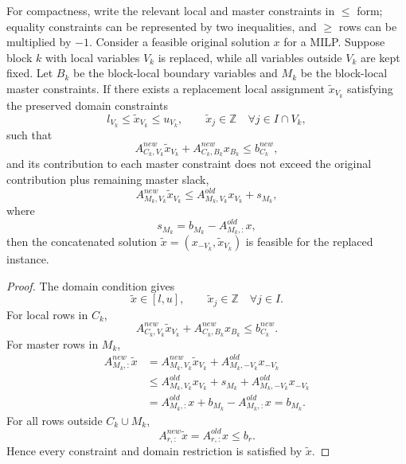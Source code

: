 \documentclass[letterpaper]{article}
\begin{document}
For compactness, write the relevant local and master constraints in
$\le$ form; equality constraints can be represented by two inequalities,
and $\ge$ rows can be multiplied by $-1$. Consider a feasible original
solution $x$ for a MILP. Suppose block $k$ with local variables $V_k$ is
replaced, while all variables outside $V_k$ are kept fixed. Let $B_k$ be
the block-local boundary variables and $M_k$ be the block-local master
constraints. If there exists a replacement local assignment
$\tilde{x}_{V_k}$ satisfying the preserved domain constraints
\begin{equation}
l_{V_k}\le \tilde{x}_{V_k}\le u_{V_k},
\qquad
\tilde{x}_j\in\mathbb{Z}\quad \forall j\in I\cap V_k,
\end{equation}
such that
\begin{equation}
A^{new}_{C_k,V_k}\tilde{x}_{V_k}
+ A^{new}_{C_k,B_k}x_{B_k}
\le b^{new}_{C_k},
\end{equation}
and its contribution to each master constraint does not exceed the
original contribution plus remaining master slack,
\begin{equation}
A^{new}_{M_k,V_k}\tilde{x}_{V_k}
\le
A^{old}_{M_k,V_k}x_{V_k}
+ s_{M_k},
\end{equation}
where
\begin{equation}
s_{M_k} = b_{M_k} - A^{old}_{M_k,:}x,
\end{equation}
then the concatenated solution
$\tilde{x}=(x_{-V_k},\tilde{x}_{V_k})$ is feasible for the replaced
instance.

\begin{proof}
The domain condition gives
\begin{equation}
\tilde{x}\in [l,u],\qquad
\tilde{x}_j\in\mathbb{Z}\quad \forall j\in I .
\end{equation}
For local rows in $C_k$,
\begin{equation}
A^{new}_{C_k,V_k}\tilde{x}_{V_k}
+ A^{new}_{C_k,B_k}x_{B_k}
\le b^{new}_{C_k}.
\end{equation}
For master rows in $M_k$,
\begin{equation}
\begin{aligned}
A^{new}_{M_k,:}\tilde{x}
&=
A^{new}_{M_k,V_k}\tilde{x}_{V_k}
+ A^{old}_{M_k,-V_k}x_{-V_k}\\
&\le
A^{old}_{M_k,V_k}x_{V_k}
+ s_{M_k}
+ A^{old}_{M_k,-V_k}x_{-V_k}\\
&=
A^{old}_{M_k,:}x
+ b_{M_k}
- A^{old}_{M_k,:}x
= b_{M_k}.
\end{aligned}
\end{equation}
For all rows outside $C_k\cup M_k$,
\begin{equation}
A^{new}_{r,:}\tilde{x}=A^{old}_{r,:}x\le b_r .
\end{equation}
Hence every constraint and domain restriction is satisfied by
$\tilde{x}$.
\end{proof}
\end{document}
